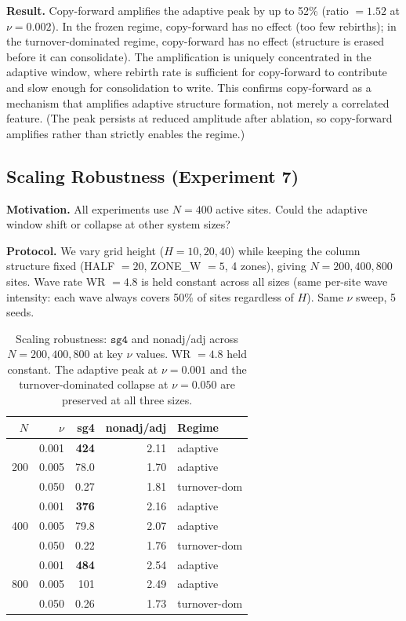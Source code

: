 \documentclass[11pt]{article}
\theoremstyle{remark}
\begin{document}
\textbf{Result.} Copy-forward amplifies the adaptive peak by up to 52\% (ratio
$= 1.52$ at $\nu = 0.002$). In the frozen regime, copy-forward has no effect
(too few rebirths); in the turnover-dominated regime, copy-forward has no effect
(structure is erased before it can consolidate). The amplification is uniquely
concentrated in the adaptive window, where rebirth rate is sufficient for
copy-forward to contribute and slow enough for consolidation to write. This
confirms copy-forward as a mechanism that amplifies adaptive structure formation,
not merely a correlated feature. (The peak persists at reduced amplitude after
ablation, so copy-forward amplifies rather than strictly enables the regime.)

\subsection{Scaling Robustness (Experiment 7)}

\textbf{Motivation.} All experiments use $N = 400$ active sites. Could the
adaptive window shift or collapse at other system sizes?

\textbf{Protocol.} We vary grid height ($H = 10, 20, 40$) while keeping the
column structure fixed (HALF $= 20$, ZONE\_W $= 5$, 4 zones), giving $N = 200,
400, 800$ sites. Wave rate WR $= 4.8$ is held constant across all sizes (same
per-site wave intensity: each wave always covers 50\% of sites regardless of
$H$). Same $\nu$ sweep, 5 seeds.

\begin{table}[h]
\centering
\caption{Scaling robustness: $\mathtt{sg4}$ and nonadj/adj across $N = 200,
400, 800$ at key $\nu$ values. WR $= 4.8$ held constant. The adaptive peak
at $\nu = 0.001$ and the turnover-dominated collapse at $\nu = 0.050$
are preserved at all three sizes.}
\label{tab:exp7}
\begin{tabular}{rrrrl}
\toprule
$N$ & $\nu$ & sg4 & nonadj/adj & Regime \\
\midrule
\multirow{3}{*}{200}
 & 0.001 & \textbf{424} & 2.11 & adaptive \\
 & 0.005 & 78.0 & 1.70 & adaptive \\
 & 0.050 & 0.27 & 1.81 & turnover-dom \\
\midrule
\multirow{3}{*}{400}
 & 0.001 & \textbf{376} & 2.16 & adaptive \\
 & 0.005 & 79.8 & 2.07 & adaptive \\
 & 0.050 & 0.22 & 1.76 & turnover-dom \\
\midrule
\multirow{3}{*}{800}
 & 0.001 & \textbf{484} & 2.54 & adaptive \\
 & 0.005 & 101  & 2.49 & adaptive \\
 & 0.050 & 0.26 & 1.73 & turnover-dom \\
\bottomrule
\end{tabular}
\end{table}
\end{document}
